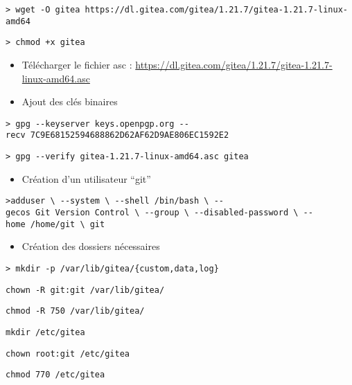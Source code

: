 \documentclass{report}
\begin{document}
\texttt{\textgreater{}\ wget\ -O\ gitea\ https://dl.gitea.com/gitea/1.21.7/gitea-1.21.7-linux-amd64}

\texttt{\textgreater{}\ chmod\ +x\ gitea}

\begin{itemize}
\item
  Télécharger le fichier asc :
  \url{https://dl.gitea.com/gitea/1.21.7/gitea-1.21.7-linux-amd64.asc}
\item
  Ajout des clés binaires
\end{itemize}

\texttt{\textgreater{}\ gpg\ -\/-keyserver\ keys.openpgp.org\ -\/-recv\ 7C9E68152594688862D62AF62D9AE806EC1592E2}

\texttt{\textgreater{}\ gpg\ -\/-verify\ gitea-1.21.7-linux-amd64.asc\ gitea}

\begin{itemize}
\tightlist
\item
  Création d'un utilisateur ``git''
\end{itemize}

\texttt{\textgreater{}adduser\ \textbackslash{}\ -\/-system\ \textbackslash{}\ -\/-shell\ /bin/bash\ \textbackslash{}\ -\/-gecos\ \textquotesingle{}Git\ Version\ Control\textquotesingle{}\ \textbackslash{}\ -\/-group\ \textbackslash{}\ -\/-disabled-password\ \textbackslash{}\ -\/-home\ /home/git\ \textbackslash{}\ git}

\begin{itemize}
\tightlist
\item
  Création des dossiers nécessaires
\end{itemize}

\texttt{\textgreater{}\ mkdir\ -p\ /var/lib/gitea/\{custom,data,log\}}

\texttt{chown\ -R\ git:git\ /var/lib/gitea/}

\texttt{chmod\ -R\ 750\ /var/lib/gitea/}

\texttt{mkdir\ /etc/gitea}

\texttt{chown\ root:git\ /etc/gitea}

\texttt{chmod\ 770\ /etc/gitea}
\end{document}
